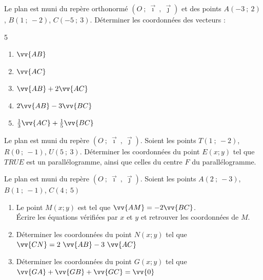 \documentclass[main.tex]{subfiles}
\begin{document}
\begin{exercise} \hfill 

\noindent Le plan est muni du repère orthonormé $(O~;~ \vec{\imath}~,~ \vec{\jmath})$ et des points $A(-3~;~2)$, $B(1~;~-2)$, $C(-5~;~3)$.  Déterminer les coordonnées des vecteurs :
\begin{multicols}{5}
\begin{enumerate}[label=\alph*),leftmargin=*]
\item $\vv{AB}$
\item $\vv{AC}$
\item $\vv{AB}+2\vv{AC}$
\item  $2\vv{AB}-3\vv{BC}$
\item $\tfrac{1}{3}\vv{AC}+\tfrac{1}{5}\vv{BC}$ 
\end{enumerate}
\end{multicols}  
\end{exercise}
\begin{exercise}[révision] \hfill 

\noindent Le plan est muni du repère   $(O~;~ \vec{\imath}~,~ \vec{\jmath})$. Soient les points $T(1~;~-2)$, $R(0~;~-1)$, $U(5~;~3)$. Déterminer les coordonnées du point $E(x;y)$ tel que $TRUE$ est un parallélogramme, ainsi que celles du centre $F$ du parallélogramme.
\end{exercise}
\begin{exercise}  Le plan est muni du repère   $(O~;~ \vec{\imath}~,~ \vec{\jmath})$. Soient les points $A(2~;~-3)$, $B(1~;~-1)$, $C(4~;~5)$

\begin{enumerate}[label=\alph*),leftmargin=*]
\item  Le point $M(x;y)$ est tel que $\vv{AM}=-2\vv{BC}$. \\
\noindent Écrire les équations vérifiées par $x$ et $y$ et retrouver les coordonnées de $M$.
\item Déterminer les coordonnées du point $N(x;y)$ tel que $\vv{CN}=2~\vv{AB}-3~\vv{AC}$
\item Déterminer les coordonnées du point $G(x;y)$ tel que $\vv{GA}+\vv{GB}+\vv{GC}=\vv{0}$
\end{enumerate} 
\end{exercise}
\end{document}
